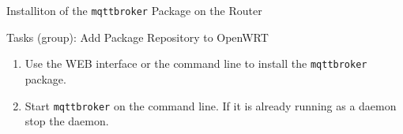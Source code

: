 ﻿
\begin{frame}{Installiton of the \alert{\texttt{mqttbroker}} Package on the Router}
{\href{https://github.com/SNodeC/mqttbroker}{}}
\begin{exampleblock}{Tasks (group): Add Package Repository to OpenWRT}
\begin{enumerate}
  \item Use the \alert{WEB interface} or the \alert{command line} to install the \alert{\texttt{mqttbroker}} package.
  \item Start \texttt{mqttbroker} on the command line. If it is already running as a daemon stop the daemon.

\end{enumerate}
\end{exampleblock}
\end{frame}
